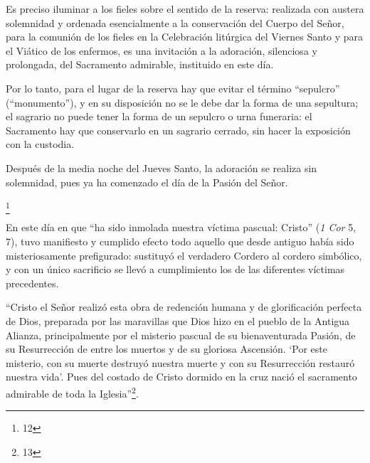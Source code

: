 			\begin{bodyintro}Es preciso iluminar a los fieles sobre el sentido de la reserva: realizada con austera solemnidad y ordenada esencialmente a la conservación del Cuerpo del Señor, para la comunión de los fieles en la Celebración litúrgica del Viernes Santo y para el Viático de los enfermos, es una invitación a la adoración, silenciosa y prolongada, del Sacramento admirable, instituido en este día.\end{bodyintro}
			
			\begin{bodyintro}Por lo tanto, para el lugar de la reserva hay que evitar el término “sepulcro” (“monumento”), y en su disposición no se le debe dar la forma de una sepultura; el sagrario no puede tener la forma de un sepulcro o urna funeraria: el Sacramento hay que conservarlo en un sagrario cerrado, sin hacer la exposición con la custodia.\end{bodyintro}
			
			\begin{bodyintro}Después de la media noche del Jueves Santo, la adoración se realiza sin solemnidad, pues ya ha comenzado el día de la Pasión del Señor.\end{bodyintro}
			
			\begin{bodyintro} \footnote{12}\end{bodyintro}
			
			\begin{bodyintro}En este día en que “ha sido inmolada nuestra víctima pascual: Cristo” (\textit{1 Cor} 5, 7), tuvo manifiesto y cumplido efecto todo aquello que desde antiguo había sido misteriosamente prefigurado: sustituyó el verdadero Cordero al cordero simbólico, y con un único sacrificio se llevó a cumplimiento los de las diferentes víctimas precedentes.\end{bodyintro}
			
			\begin{bodyintro}“Cristo el Señor realizó esta obra de redención humana y de glorificación perfecta de Dios, preparada por las maravillas que Dios hizo en el pueblo de la Antigua Alianza, principalmente por el misterio pascual de su bienaventurada Pasión, de su Resurrección de entre los muertos y de su gloriosa Ascensión. ‘Por este misterio, con su muerte destruyó nuestra muerte y con su Resurrección restauró nuestra vida’. Pues del costado de Cristo dormido en la cruz nació el sacramento admirable de toda la Iglesia”\footnote{13}.\end{bodyintro}
			

